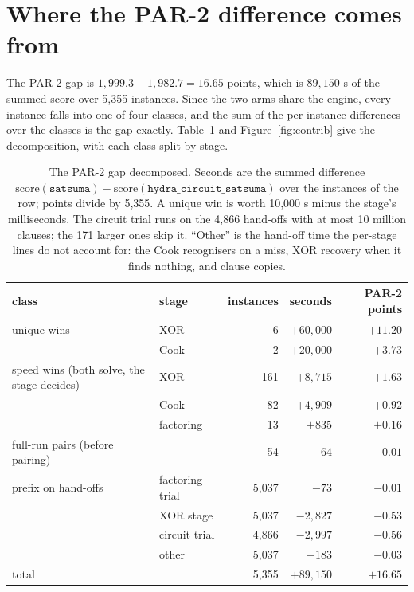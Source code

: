 \documentclass[10pt]{article}
\newcommand{\hcs}{\texttt{hydra\_circuit\_satsuma}}
\newcommand{\sats}{\texttt{satsuma}}
\newcommand{\partwo}{PAR-2}
\begin{document}
\section{Where the \partwo{} difference comes from}
\label{sec:account}

The \partwo{} gap is $1{,}999.3 - 1{,}982.7 = 16.65$ points, which is
$89{,}150$ s of the summed score over 5,355 instances. Since the two arms
share the engine, every instance falls into one of four classes, and the
sum of the per-instance differences over the classes is the gap exactly.
Table~\ref{tab:account} and Figure~\ref{fig:contrib} give the
decomposition, with each class split by stage.

\begin{table}[h]
\centering
\begin{tabular}{llrrr}
\toprule
class & stage & instances & seconds & \partwo{} points \\
\midrule
unique wins & XOR & 6 & $+60{,}000$ & $+11.20$ \\
 & Cook & 2 & $+20{,}000$ & $+3.73$ \\
speed wins (both solve, the stage decides) & XOR & 161 & $+8{,}715$ & $+1.63$ \\
 & Cook & 82 & $+4{,}909$ & $+0.92$ \\
 & factoring & 13 & $+835$ & $+0.16$ \\
full-run pairs (before pairing) & & 54 & $-64$ & $-0.01$ \\
prefix on hand-offs & factoring trial & 5,037 & $-73$ & $-0.01$ \\
 & XOR stage & 5,037 & $-2{,}827$ & $-0.53$ \\
 & circuit trial & 4,866 & $-2{,}997$ & $-0.56$ \\
 & other & 5,037 & $-183$ & $-0.03$ \\
\midrule
total & & 5,355 & $+89{,}150$ & $+16.65$ \\
\bottomrule
\end{tabular}
\caption{The \partwo{} gap decomposed. Seconds are the summed difference
$\text{score}(\sats) - \text{score}(\hcs)$ over the instances of the row;
points divide by 5,355. A unique win is worth 10,000 s minus the stage's
milliseconds. The circuit trial runs on the 4,866 hand-offs with at most
10 million clauses; the 171 larger ones skip it. ``Other'' is the
hand-off time the per-stage lines do not account for: the Cook recognisers
on a miss, XOR recovery when it finds nothing, and clause copies.}
\label{tab:account}
\end{table}
\end{document}
